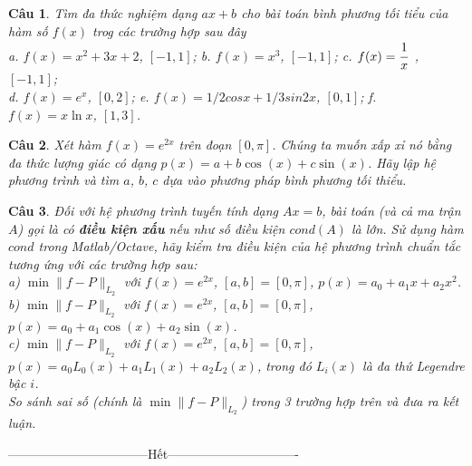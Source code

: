 \documentclass[11pt]{article}
\newtheorem{bt}{Câu}
\begin{document}
\begin{bt}
	Tìm đa thức nghiệm dạng $ax+b$ cho bài toán bình phương tối tiểu của hàm số $f(x)$ trog các trường hợp sau đây \\
	a. $f(x) = x^2 + 3x + 2$, $[-1,1]$; \qquad b. $f(x) = x^3$, $[-1, 1]$; \qquad c. $f(x) = \cfrac{1}{x}$\ , $[-1, 1]$; \\
	d. $f(x) = e^x$, $[0, 2]$; \qquad e. $f(x) = 1/2 cos x + 1/3 sin 2x$, $[0, 1]$; \qquad f. $f(x) = x \ln x$, $[1, 3]$.
\end{bt}

\begin{bt}
Xét hàm $f(x) = e^{2x}$ trên đoạn $[0, \pi]$. Chúng ta muốn xấp xỉ nó bằng đa thức lượng giác có dạng $p(x) = a + b \cos(x) + c \sin(x)$. Hãy lập hệ phương trình và tìm $a$, $b$, $c$ dựa vào phương pháp bình phương tối thiểu.
\end{bt}

\begin{bt} Đối với hệ phương trình tuyến tính dạng $Ax=b$, bài toán (và cả ma trận $A$) gọi là có \textbf{điều kiện xấu} nếu như số điều kiện $cond(A)$ là lớn. Sử dụng hàm $cond$ trong Matlab/Octave, hãy kiểm tra điều kiện của hệ phương trình chuẩn tắc tương ứng với các trường hợp sau:\\
a) $\min \|f-P\|_{L_2}$ với $f(x)=e^{2x}$, $[a,b]=[0,\pi]$, $p(x)=a_0 + a_1 x + a_2 x^2 $.	 \\
b) $\min \|f-P\|_{L_2}$ với $f(x)=e^{2x}$, $[a,b]=[0,\pi]$, $p(x)=a_0 + a_1 \cos(x) + a_2 \sin(x) $. \\
c) $\min \|f-P\|_{L_2}$ với $f(x)=e^{2x}$, $[a,b]=[0,\pi]$, $p(x)=a_0 L_0(x) + a_1 L_1(x) + a_2 L_2(x)$, trong đó $L_i(x)$ là đa thứ Legendre bậc $i$.\\
So sánh sai số (chính là $\min \|f-P\|_{L_2}$) trong 3 trường hợp trên và đưa ra kết luận.
\end{bt}


\centerline{———————————Hết——————————-}
\end{document}

